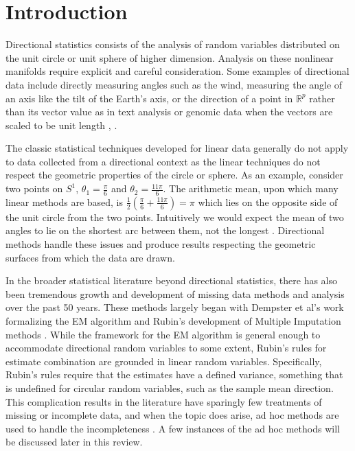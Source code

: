\section{Introduction}\label{intro}

Directional statistics consists of the analysis of random variables distributed on the unit circle or unit sphere of higher dimension. Analysis on these nonlinear manifolds require explicit and careful consideration. Some examples of directional data include directly measuring angles such as the wind, measuring the angle of an axis like the tilt of the Earth's axis, or the direction of a point in $\mathbb{R}^p$ rather than its vector value as in text analysis or genomic data when the vectors are scaled to be unit length \cite{mardia_directional_1999}, \cite{ley_applied_2018}. 

The classic statistical techniques developed for linear data generally do not apply to data collected from a directional context as the linear techniques do not respect the geometric properties of the circle or sphere. As an example, consider two points on $S^1$, $\theta_1 = \frac{\pi}{6}$ and $\theta_2 = \frac{11\pi}{6}$. The arithmetic mean, upon which many linear methods are based, is $\frac{1}{2}(\frac{\pi}{6} + \frac{11\pi}{6}) = \pi$ which lies on the opposite side of the unit circle from the two points. Intuitively we would expect the mean of two angles to lie on the shortest arc between them, not the longest \cite{mardia_directional_1999}. Directional methods handle these issues and produce results respecting the geometric surfaces from which the data are drawn.

In the broader statistical literature beyond directional statistics, there has also been tremendous growth and development of missing data methods and analysis over the past 50 years. These methods largely began with Dempster et al's work formalizing the EM algorithm \cite{dempster_maximum_1977} and Rubin's development of Multiple Imputation methods \cite{rubin_inference_1976}. While the framework for the EM algorithm is general enough to accommodate directional random variables to some extent, Rubin's rules for estimate combination are grounded in linear random variables. Specifically, Rubin's rules require that the estimates have a defined variance, something that is undefined for circular random variables, such as the sample mean direction. This complication results in the literature have sparingly few treatments of missing or incomplete data, and when the topic does arise, ad hoc methods are used to handle the incompleteness \cite{nunez-antonio_bayesian_2011} \cite{anderson-sprecher_state-space_2021} \cite{kato_dependent_2008}. A few instances of the ad hoc methods will be discussed later in this review.

